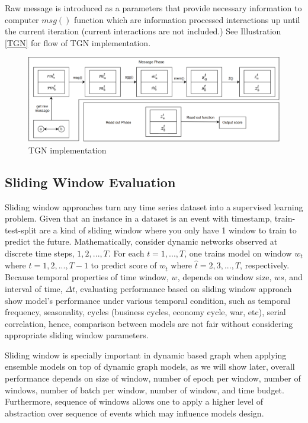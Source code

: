\documentclass{IEEEtran}
\begin{document}
Raw message is introduced as a parameters that provide necessary information to computer \(msg()\) function which are information processed interactions up until the current iteration (current interactions are not included.) See Illustration \ref{TGN} for flow of TGN implementation.

\begin{figure}[htbp]
\centering
\includegraphics[width=.9\linewidth]{./images/screenshot_20220405_133740.png}
\caption{\label{TGN implementation}TGN implementation}
\end{figure}

\subsection{Sliding Window Evaluation}
\label{sec:org0030404}
Sliding window approaches turn any time series dataset into a supervised learning problem. Given that an instance in a dataset is an event with timestamp, train-test-split are a kind of sliding window where you only have 1 window to train to predict the future. Mathematically, consider dynamic networks observed at discrete time steps, \(1,2,...,T\). For each \(t = 1,...,T\), one trains model on window \(w_{t}\) where \(t=1,2,...,T-1\) to predict score of \(w_{\hat t}\) where \(\hat t=2,3,...,T\), respectively. Because temporal properties of time window, \(w\), depends on window size, \(ws\), and interval of time, \(\Delta t\), evaluating performance based on sliding window approach show model's performance under various temporal condition, such as temporal frequency, seasonality, cycles (business cycles, economy cycle, war, etc), serial correlation, hence, comparison between models are not fair without considering appropriate sliding window parameters.

Sliding window is specially important in dynamic based graph when applying ensemble models on top of dynamic graph models, as we will show later, overall performance depends on size of window, number of epoch per window, number of windows, number of batch per window, number of window, and time budget. Furthermore, sequence of windows allows one to apply a higher level of abstraction over sequence of events which may influence models design.
\end{document}
